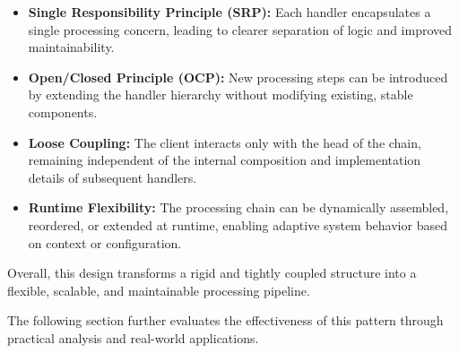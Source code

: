 \begin{itemize}
    \item \textbf{Single Responsibility Principle (SRP):} Each handler encapsulates a single processing concern, leading to clearer separation of logic and improved maintainability.
    
    \item \textbf{Open/Closed Principle (OCP):} New processing steps can be introduced by extending the handler hierarchy without modifying existing, stable components.
    
    \item \textbf{Loose Coupling:} The client interacts only with the head of the chain, remaining independent of the internal composition and implementation details of subsequent handlers.
    
    \item \textbf{Runtime Flexibility:} The processing chain can be dynamically assembled, reordered, or extended at runtime, enabling adaptive system behavior based on context or configuration.
\end{itemize}

Overall, this design transforms a rigid and tightly coupled structure into a flexible, scalable, and maintainable processing pipeline.

The following section further evaluates the effectiveness of this pattern through practical analysis and real-world applications.
